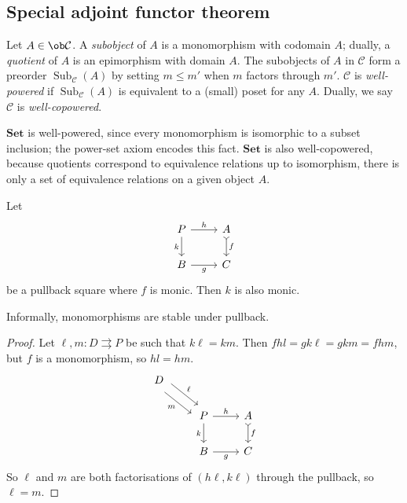 \subsection{Special adjoint functor theorem}
\begin{definition}
    Let \( A \in \ob \mathcal C \).
    A \emph{subobject} of \( A \) is a monomorphism with codomain \( A \); dually, a \emph{quotient} of \( A \) is an epimorphism with domain \( A \).
    The subobjects of \( A \) in \( \mathcal C \) form a preorder \( \operatorname{Sub}_{\mathcal C}(A) \) by setting \( m \leq m' \) when \( m \) factors through \( m' \).
    \( \mathcal C \) is \emph{well-powered} if \( \operatorname{Sub}_{\mathcal C}(A) \) is equivalent to a (small) poset for any \( A \).
    Dually, we say \( \mathcal C \) is \emph{well-copowered}.
\end{definition}
\begin{example}
    \( \mathbf{Set} \) is well-powered, since every monomorphism is isomorphic to a subset inclusion; the power-set axiom encodes this fact.
    \( \mathbf{Set} \) is also well-copowered, because quotients correspond to equivalence relations up to isomorphism, there is only a set of equivalence relations on a given object \( A \).
\end{example}
\begin{lemma}
    Let
\[\begin{tikzcd}
	P & A \\
	B & C
	\arrow["h", from=1-1, to=1-2]
	\arrow["f", tail, from=1-2, to=2-2]
	\arrow["k"', from=1-1, to=2-1]
	\arrow["g"', from=2-1, to=2-2]
\end{tikzcd}\]
    be a pullback square where \( f \) is monic.
    Then \( k \) is also monic.
\end{lemma}
Informally, monomorphisms are stable under pullback.
\begin{proof}
    Let \( \ell, m : D \rightrightarrows P \) be such that \( k\ell = km \).
    Then \( fhl = gk\ell = gkm = fhm \), but \( f \) is a monomorphism, so \( hl = hm \).
\[\begin{tikzcd}
	D \\
	& P & A \\
	& B & C
	\arrow["h", from=2-2, to=2-3]
	\arrow["f", tail, from=2-3, to=3-3]
	\arrow["k"', from=2-2, to=3-2]
	\arrow["g"', from=3-2, to=3-3]
	\arrow["\ell", shift left=2, from=1-1, to=2-2]
	\arrow["m"', shift right=2, from=1-1, to=2-2]
\end{tikzcd}\]
    So \( \ell \) and \( m \) are both factorisations of \( (h\ell, k\ell) \) through the pullback, so \( \ell = m \).
\end{proof}
